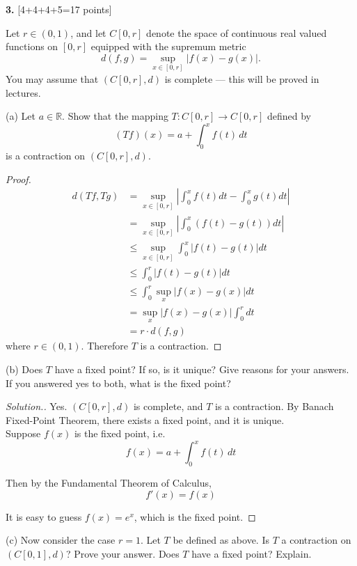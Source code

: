 \documentclass[11pt,a4paper]{amsart}
\def\R{{\mathbb R}}
\def\ra{\rightarrow}
\begin{document}
\bigskip


{\bf 3.} [4+4+4+5=17 points]

Let $r\in(0,1)$, and let $C[0,r]$ denote the space of continuous real valued functions on $[0,r]$ equipped
with the supremum metric
$$ d(f,g)=\sup_{x\in[0,r]}|f(x)-g(x)|.  $$
You may assume that $(C[0,r],d)$ is complete ---
this will be proved in lectures.

(a) Let $a\in\R$. Show that the mapping $T:C[0,r]\ra C[0,r]$ defined  by
$$ (Tf)(x) = a + \int_0^x f(t)\, dt $$
is a contraction on $(C[0,r],d)$.

\begin{proof}
  \begin{align*}
    d(Tf, Tg) &= \sup_{x\in[0,r]} \left\rvert \int_0^x f(t) dt - \int_0^x g(t) dt \right\rvert \\
      &= \sup_{x\in[0,r]} \left\rvert \int_0^x (f(t) -g(t)) dt \right\rvert \\
      &\le \sup_{x\in[0,r]}  \int_0^x |f(t) -g(t)| dt  \\
      &\le \int_0^r |f(t) -g(t)| dt \\
      &\le \int_0^r \sup_{x}|f(x) -g(x)| dt \\
      &= \sup_{x}|f(x) -g(x)| \int_0^r dt \\
      &= r \cdot d(f,g)
  \end{align*}
  where $r\in(0,1)$. Therefore $T$ is a contraction.
\end{proof}
\medskip

(b) Does $T$ have a fixed point? If so, is it unique? Give reasons for your answers.
	If you answered yes to both, what is the fixed point?

  \begin{proof}[Solution.]
    Yes. $(C[0,r],d)$ is complete, and $T$ is a contraction.
    By Banach Fixed-Point Theorem, there exists a fixed point, and it is unique. \\

    Suppose $f(x)$ is the fixed point, i.e.
    $$ f(x) = a + \int_0^x f(t)\, dt $$

    Then by the Fundamental Theorem of Calculus,
    $$ f'(x) = f(x) $$

    It is easy to guess $f(x) = e^x$, which is the fixed point.
  \end{proof}

\medskip

(c) Now consider the case $r=1$. Let $T$ be defined as above.
Is $T$ a contraction on $(C[0,1],d)$? Prove your answer.
Does $T$ have a fixed point? Explain.
\end{document}
